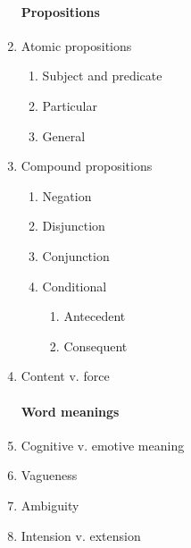 \documentclass[10pt,landscape]{article}
\begin{document}
\begin{multicols}{2}
\begin{enumerate}
\paragraph{Propositions}
   \item Atomic propositions
    \begin{enumerate}
     \item Subject and predicate
     \item Particular
     \item General
    \end{enumerate}
   \item Compound propositions
    \begin{enumerate}
     \item Negation
     \item Disjunction
     \item Conjunction
     \item Conditional
      \begin{enumerate}
       \item Antecedent
       \item Consequent
      \end{enumerate}
    \end{enumerate}
  \item Content v. force
\paragraph{Word meanings}

   \item Cognitive v. emotive meaning
   \item Vagueness
   \item Ambiguity
   \item Intension v. extension
  

\end{enumerate}
\end{multicols}
\end{document}
